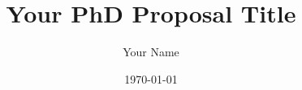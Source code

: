 \documentclass[12pt, a4paper]{report}
\begin{document}
\title{Your PhD Proposal Title}
\author{Your Name}
\date{\today}
\maketitle

\tableofcontents






\printbibliography
\end{document}
